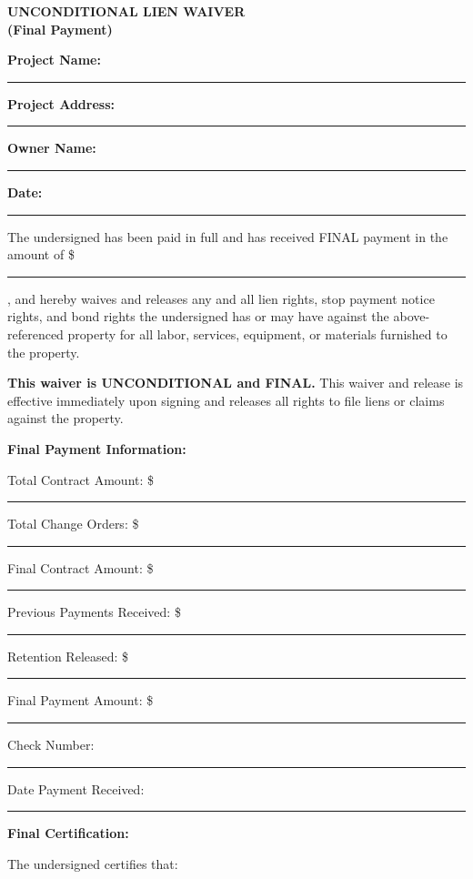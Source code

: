 \documentclass[11pt,letterpaper]{article}
\begin{document}
\newpage

\begin{center}
\textbf{\Large UNCONDITIONAL LIEN WAIVER}\\
\textbf{\Large (Final Payment)}
\end{center}

\vspace{12pt}

\textbf{Project Name:} \rule{9cm}{0.4pt}

\textbf{Project Address:} \rule{9cm}{0.4pt}

\textbf{Owner Name:} \rule{9cm}{0.4pt}

\textbf{Date:} \rule{4cm}{0.4pt}

\vspace{6pt}

The undersigned has been paid in full and has received FINAL payment in the amount of \$ \rule{4cm}{0.4pt}, and hereby waives and releases any and all lien rights, stop payment notice rights, and bond rights the undersigned has or may have against the above-referenced property for all labor, services, equipment, or materials furnished to the property.

\vspace{6pt}

\textbf{This waiver is UNCONDITIONAL and FINAL.} This waiver and release is effective immediately upon signing and releases all rights to file liens or claims against the property.

\vspace{6pt}

\textbf{Final Payment Information:}

Total Contract Amount: \$ \rule{5cm}{0.4pt}

Total Change Orders: \$ \rule{5cm}{0.4pt}

Final Contract Amount: \$ \rule{5cm}{0.4pt}

Previous Payments Received: \$ \rule{5cm}{0.4pt}

Retention Released: \$ \rule{5cm}{0.4pt}

Final Payment Amount: \$ \rule{5cm}{0.4pt}

Check Number: \rule{4cm}{0.4pt}

Date Payment Received: \rule{4cm}{0.4pt}

\vspace{6pt}

\textbf{Final Certification:}

The undersigned certifies that:
\end{document}

